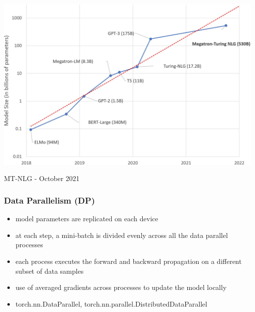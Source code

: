 \documentclass{beamer}
\begin{document}
\begin{frame}
    \begin{center}
        \includegraphics[scale=0.725]{img/MT-NLG.png}
    \end{center}
    \tiny{MT-NLG - October 2021}
\end{frame}

\begin{frame}
    \frametitle{Data Parallelism (DP)}
    \begin{itemize}
        \item model parameters are replicated on each device
        \item at each step, a mini-batch is divided evenly across all the data parallel processes
        \item each process executes the forward and backward propagation on a different subset of data samples
        \item use of averaged gradients across processes to update the model locally
        \item torch.nn.DataParallel, torch.nn.parallel.DistributedDataParallel
    \end{itemize}
\end{frame}
\end{document}
